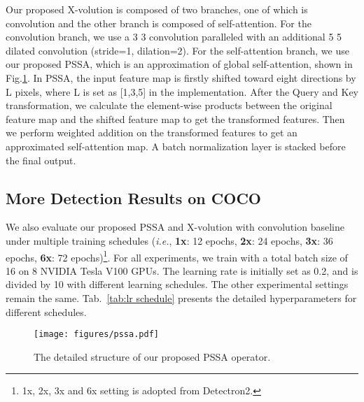\documentclass{article}
\begin{document}
Our proposed X-volution is composed of two branches, one of which is convolution and the other branch is composed of self-attention. For the convolution branch, we use a 3  3 convolution paralleled with an additional 5  5 dilated convolution (stride=1, dilation=2). For the self-attention branch, we use our proposed PSSA, which is an approximation of global self-attention, shown in Fig.\ref{fig:pssa}. In PSSA, the input feature map is firstly shifted toward eight directions by L pixels, where L is set as [1,3,5] in the implementation. After the Query and Key transformation, we calculate the element-wise products between the original feature map and the shifted feature map to get the transformed features. Then we perform weighted addition on the transformed features to get an approximated self-attention map. A batch normalization layer is stacked before the final output.

\subsection{More Detection Results on COCO}
\label{supp_sec2}



We also evaluate our proposed PSSA and X-volution with convolution baseline under multiple training schedules (\emph{i.e.}, \textbf{1x}: 12 epochs, \textbf{2x}: 24 epochs, \textbf{3x}: 36 epochs, \textbf{6x}: 72 epochs)\footnote{1x, 2x, 3x and 6x setting is adopted from Detectron2. \vspace{2mm}}.
For all experiments, we train with a total batch size of 16 on 8 NVIDIA Tesla V100 GPUs. The learning rate is initially set as 0.2, and is divided by 10 with different learning schedules. The other experimental settings remain the same. Tab.~\ref{tab:lr schedule} presents the detailed hyperparameters for different schedules.

\begin{figure}[t]	
    \centering	
	\texttt{[image: figures/pssa.pdf]}
	\small
	\caption{The detailed structure of our proposed PSSA operator.}
    \label{fig:pssa}
\end{figure}
\end{document}

